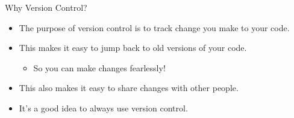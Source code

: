 \begin{frame}{Why Version Control?}

 \begin{itemize}

  \item The purpose of version control is to track change you make to your 
   code.

  \item This makes it easy to jump back to old versions of your code.

  \begin{itemize}
   \item So you can make changes fearlessly!
  \end{itemize}

  \item This also makes it easy to share changes with other people.

  \item It's a good idea to always use version control.
 
 \end{itemize}

\end{frame}


